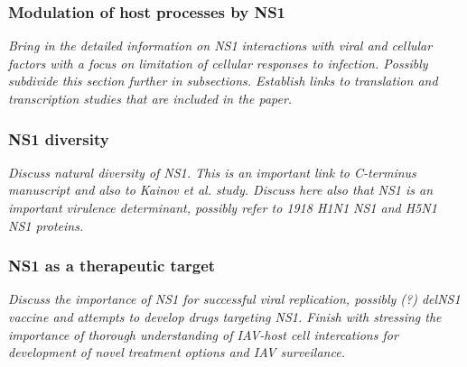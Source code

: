		\subsubsection{Modulation of host processes by NS1}
		
		\textit{Bring in the detailed information on NS1 interactions with viral and cellular factors with a focus on limitation of cellular responses to infection. Possibly subdivide this section further in subsections. Establish links to translation and transcription studies that are included in the paper.}
		
		\subsubsection{NS1 diversity}
		
		\textit{Discuss natural diversity of NS1. This is an important link to C-terminus manuscript and also to Kainov et al. study. Discuss here also that NS1 is an important virulence determinant, possibly refer to 1918 H1N1 NS1 and H5N1 NS1 proteins.}
		
		\subsubsection{NS1 as a therapeutic target}
		
		\textit{Discuss the importance of NS1 for successful viral replication, possibly (?) delNS1 vaccine and attempts to develop drugs targeting NS1. Finish with stressing the importance of thorough understanding of IAV-host cell intercations for development of novel treatment options and IAV surveilance.}